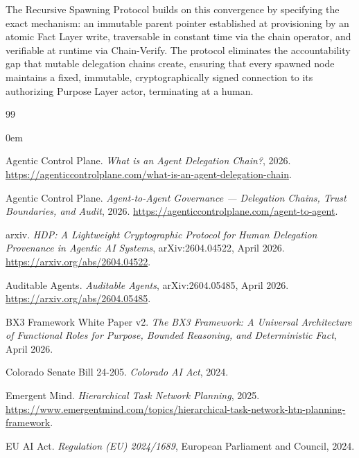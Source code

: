 The Recursive Spawning Protocol builds on this convergence by specifying the exact mechanism: an immutable parent pointer established at provisioning by an atomic Fact Layer write, traversable in constant time via the chain operator, and verifiable at runtime via Chain-Verify. The protocol eliminates the accountability gap that mutable delegation chains create, ensuring that every spawned node maintains a fixed, immutable, cryptographically signed connection to its authorizing Purpose Layer actor, terminating at a human.

\begin{thebibliography}{99}


\itemsep0em

\item Agentic Control Plane. \emph{What is an Agent Delegation Chain?}, 2026. \url{https://agenticcontrolplane.com/what-is-an-agent-delegation-chain}.

\item Agentic Control Plane. \emph{Agent-to-Agent Governance --- Delegation Chains, Trust Boundaries, and Audit}, 2026. \url{https://agenticcontrolplane.com/agent-to-agent}.

\item arxiv. \emph{HDP: A Lightweight Cryptographic Protocol for Human Delegation Provenance in Agentic AI Systems}, arXiv:2604.04522, April 2026. \url{https://arxiv.org/abs/2604.04522}.

\item Auditable Agents. \emph{Auditable Agents}, arXiv:2604.05485, April 2026. \url{https://arxiv.org/abs/2604.05485}.

\item BX3 Framework White Paper v2. \emph{The BX3 Framework: A Universal Architecture of Functional Roles for Purpose, Bounded Reasoning, and Deterministic Fact}, April 2026.

\item Colorado Senate Bill 24-205. \emph{Colorado AI Act}, 2024.

\item Emergent Mind. \emph{Hierarchical Task Network Planning}, 2025. \url{https://www.emergentmind.com/topics/hierarchical-task-network-htn-planning-framework}.

\item EU AI Act. \emph{Regulation (EU) 2024/1689}, European Parliament and Council, 2024.


\end{thebibliography}
